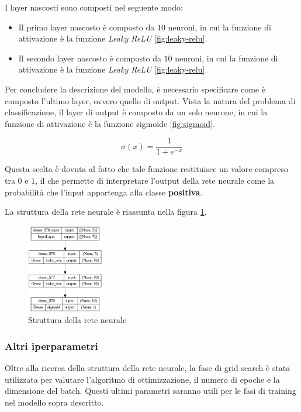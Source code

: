 I layer nascosti sono composti nel seguente modo:
\begin{itemize}
    \item Il primo layer nascosto è composto da $10$ neuroni, in cui la funzione di
          attivazione è la funzione \textit{Leaky ReLU} \ref{fig:leaky-relu}.
    \item Il secondo layer nascosto è composto da $10$ neuroni, in cui la funzione
          di attivazione è la funzione \textit{Leaky ReLU} \ref{fig:leaky-relu}.
\end{itemize}

Per concludere la descrizione del modello, è necessario specificare come è composto 
l'ultimo layer, ovvero quello di output. Vista la natura del problema di classificazione, 
il layer di output è composto da un solo neurone, in cui la funzione di attivazione 
è la funzione sigmoide \ref{fig:sigmoid}.

\begin{equation}
    \sigma(x) = \frac{1}{1 + e^{-x}}
\end{equation}

Questa scelta è dovuta al fatto che tale funzione restituisce un valore compreso
tra $0$ e $1$, il che permette di interpretare l'output della rete neurale come la
probabilità che l'input appartenga alla classe \textbf{positiva}.

La struttura della rete neurale è riassunta nella figura \ref{fig:strutturaReteNeurale}.

\begin{figure}[!ht]
    \centering
    \includegraphics[width=0.3\textwidth]{img/rete/struttura_rete.png}
    \caption{Struttura della rete neurale}
    \label{fig:strutturaReteNeurale}
\end{figure}

\subsubsection{Altri iperparametri}
Oltre alla ricerca della struttura della rete neurale, la fase di grid search è
stata utilizzata per valutare l'algoritmo di ottimizzazione, il numero di epoche
e la dimensione del batch. Questi ultimi parametri saranno utili per le fasi di training
nel modello sopra descritto.

